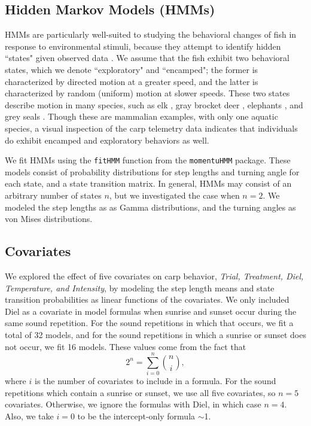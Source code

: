 \documentclass[12pt]{article}
\begin{document}
	\subsection{Hidden Markov Models (HMMs)}
	
		HMMs are particularly well-suited to studying the behavioral changes of fish in response to environmental stimuli, because they attempt to identify hidden ``states" given observed data \cite{Rabiner1989}. We assume that the fish exhibit two behavioral states, which we denote ``exploratory" and ``encamped"; the former is characterized by directed motion at a greater speed, and the latter is characterized by random (uniform) motion at slower speeds. These two states describe motion in many species, such as elk \cite{Morales2004, Fryxell2008}, gray brocket deer \cite{Grotta-Neto2019}, elephants \cite{Roever2014, Vogel2019}, and grey seals \cite{Breed2009}. Though these are mammalian examples, with only one aquatic species, a visual inspection of the carp telemetry data indicates that individuals do exhibit encamped and exploratory behaviors as well.
		
		We fit HMMs using the \texttt{fitHMM} function from the \texttt{momentuHMM} package. These models consist of probability distributions for step lengths and turning angle for each state, and a state transition matrix. In general, HMMs may consist of an arbitrary number of states $n$, but we investigated the case when $n = 2$. We modeled the step lengths as as Gamma distributions, and the turning angles as von Mises distributions.
	
	\subsection{Covariates}
	
		We explored the effect of five covariates on carp behavior, \emph{Trial, Treatment, Diel, Temperature, and Intensity}, by modeling the step length means and state transition probabilities as linear functions of the covariates. We only included Diel as a covariate in model formulas when sunrise and sunset occur during the same sound repetition. For the sound repetitions in which that occurs, we fit a total of 32 models, and for the sound repetitions in which a sunrise or sunset does not occur, we fit 16 models. These values come from the fact that
		\[2^n = \sum_{i=0}^n {n \choose i},\]
		where $i$ is the number of covariates to include in a formula. For the sound repetitions which contain a sunrise or sunset, we use all five covariates, so $n = 5$ covariates. Otherwise, we ignore the formulas with Diel, in which case $n = 4$. Also, we take $i = 0$ to be the intercept-only formula $\sim$1.
		
\end{document}
